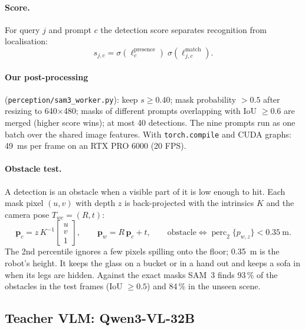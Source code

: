\documentclass[10pt,a4paper]{article}
\newcommand{\code}[1]{\texttt{#1}}
\begin{document}
\paragraph{Score.} For query $j$ and prompt $c$ the detection score separates recognition from localisation:
\begin{equation}
s_{j,c} = \sigma(\ell^{\text{presence}}_{c})\;\sigma(\ell^{\text{match}}_{j,c}).
\end{equation}

\paragraph{Our post-processing} (\code{perception/sam3\_worker.py}): keep $s\geq0.40$; mask probability $>0.5$ after resizing to
640$\times$480; masks of different prompts overlapping with IoU $\geq0.6$ are merged (higher score wins); at most 40 detections.
The nine prompts run as one batch over the shared image features. With \code{torch.compile} and CUDA graphs: 49~ms per frame on an
RTX PRO 6000 (20 FPS).

\paragraph{Obstacle test.} A detection is an obstacle when a visible part of it is low enough to hit. Each mask pixel $(u,v)$
with depth $z$ is back-projected with the intrinsics $K$ and the camera pose $T_{wc}=(R,t)$:
\begin{equation}
\bm p_c = z\,K^{-1}\begin{bmatrix}u\\v\\1\end{bmatrix},\qquad \bm p_w = R\,\bm p_c + t,\qquad
\text{obstacle} \iff \operatorname{perc}_{2}\{p_{w,z}\} < 0.35~\text{m}.
\end{equation}
The 2nd percentile ignores a few pixels spilling onto the floor; 0.35~m is the robot's height. It keeps the glass on a bucket or
in a hand out and keeps a sofa in when its legs are hidden. Against the exact masks SAM~3 finds 93\,\% of the obstacles in the
test frames (IoU $\geq0.5$) and 84\,\% in the unseen scene.

\subsection{Teacher VLM: Qwen3-VL-32B}
\end{document}
